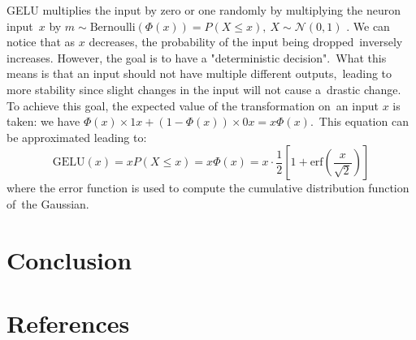 \documentclass[12pt]{article}
\begin{document}
GELU multiplies the input by zero or one randomly by multiplying the neuron input\
$x$ by \( m \sim  \text{Bernoulli}(\Phi(x))=P(X \leq x),\ X \sim \mathcal{N}(0,1)\)
.  We can notice that as $x$ decreases, the probability of the input being dropped\
inversely increases. However, the goal is to have a "deterministic decision".\
What this means is that an input should not have multiple different outputs,\
leading to more stability since slight changes in the input will not cause a\
drastic change. To achieve this goal, the expected value of the transformation on\
an input $x$ is taken: we have \( \Phi(x) \times 1x + (1 - \Phi(x)) \times 0x = x\Phi(x) \).\
This equation can be approximated leading to:
\[
    \text{GELU}(x) = xP(X \leq x) = x\Phi(x) = x \cdot \frac{1}{2}\left [1 + \text{erf}\left(\frac{x}{\sqrt{2}}\right) \right]
\]
where the error function is used to compute the cumulative distribution function of\
the Gaussian.

\text{\newline}





\section{Conclusion}


\section{References}
\end{document}
